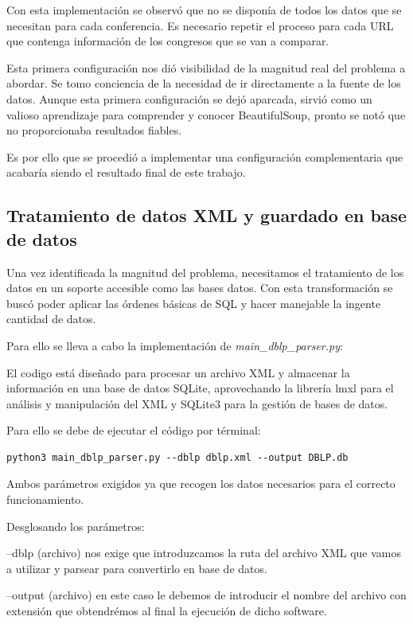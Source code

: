 \documentclass[a4paper, 12pt]{book}
\begin{document}
Con esta implementación se observó que no se disponía de todos los datos que se necesitan para cada conferencia. Es necesario repetir el proceso para cada URL que contenga información de los congresos que se van a comparar.

Esta primera configuración nos dió visibilidad de la magnitud real del problema a abordar. Se tomo conciencia de la necesidad de ir directamente a la fuente de los datos. Aunque esta primera configuración se dejó aparcada, sirvió como un valioso aprendizaje para comprender y conocer BeautifulSoup, pronto se notó que no proporcionaba resultados fiables.

Es por ello que se procedió a implementar una configuración complementaria que acabaría siendo el resultado final de este trabajo.

\subsection{Tratamiento de datos XML y guardado en base de datos}

Una vez identificada la magnitud del problema, necesitamos el tratamiento de los datos en un soporte accesible como las bases datos. Con esta transformación se buscó poder aplicar las órdenes básicas de SQL y hacer manejable la ingente cantidad de datos.

Para ello se lleva a cabo la implementación de \textit{main\_dblp\_parser.py}:

El codigo está diseñado para procesar un archivo XML y almacenar la información en una base de datos SQLite, aprovechando la librería lmxl para el análisis y manipulación del XML y SQLite3 para la gestión de bases de datos.

Para ello se debe de ejecutar el código por términal:

\begin{verbatim}
python3 main_dblp_parser.py --dblp dblp.xml --output DBLP.db 
\end{verbatim}

Ambos parámetros exigidos ya que recogen los datos necesarios para el correcto funcionamiento.

Desglosando los parámetros:

--dblp (archivo) nos exige que introduzcamos la ruta del archivo XML que vamos a utilizar y parsear para convertirlo en base de datos.

--output (archivo) en este caso le debemos de introducir el nombre del archivo con extensión que obtendrémos al final la ejecución de dicho software. 
\end{document}
